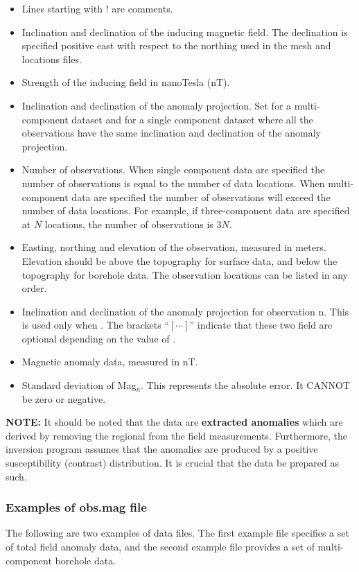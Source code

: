 \begin{itemize}
\item[\codeName{!}] Lines starting with ! are comments.
\item[\codeName{incl/decl}] Inclination and declination of the inducing magnetic field. The declination is specified positive east with respect to the northing used in the mesh and locations files.
\item[\codeName{geomag}] Strength of the inducing field in nanoTesla (nT).
\item[\codeName{aincl/adecl/idir}] Inclination and declination of the anomaly projection. Set  for a multi-component dataset and  for a single component dataset where all the observations have the same inclination and declination of the anomaly projection.
\item[\codeName{ndat}] Number of observations. When single component data are specified the number of observations is equal to the number of data locations. When multi-component data are specified the number of observations will exceed the number of data locations. For example, if three-component data are specified at $N$ locations, the number of observations is $3N$.
\item[\codeName{E$_n$,N$_n$,Elev$_n$}] Easting, northing and elevation of the observation, measured in meters. Elevation should be above the topography for surface data, and below the topography for borehole data. The observation locations can be listed in any order.
\item[\codeName{ainc$_n$/adec$_n$}] Inclination and declination of the anomaly projection for observation n. This is used only when . The brackets ``$[\cdots]$'' indicate that these two field are optional depending on the value of .
\item[\codeName{Mag$_n$}] Magnetic anomaly data, measured in nT.
\item[\codeName{Err$_n$}] Standard deviation of Mag$_n$. This represents the absolute error. It CANNOT be zero or negative.
\end{itemize}

\textbf{NOTE:} It should be noted that the data are \textbf{extracted anomalies} which are derived by removing the regional from the field measurements. Furthermore, the inversion program assumes that the anomalies are produced by a positive susceptibility (contrast) distribution. It is crucial that the data be prepared as such.

\subsubsection*{Examples of obs.mag file}
The following are two examples of data files. The first example file specifies a set of total field anomaly data, and the second example file provides a set of multi-component borehole data.

